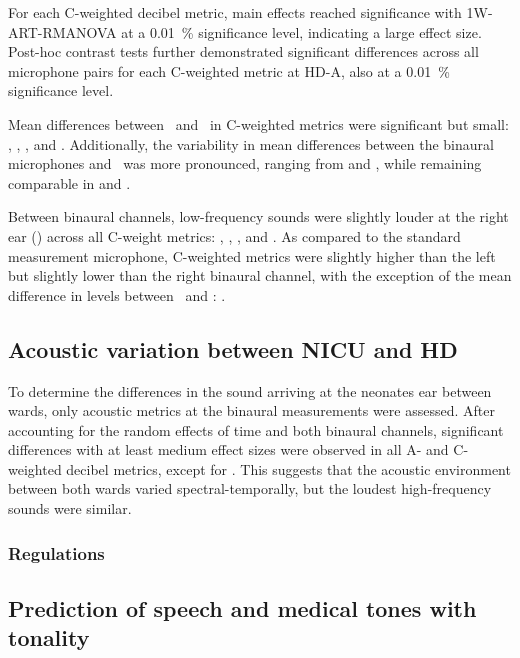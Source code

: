 For each C-weighted decibel metric, main effects reached significance with 1W-ART-RMANOVA at a \SI{0.01}{\percent} significance level, indicating a large effect size. Post-hoc contrast tests further demonstrated significant differences across all microphone pairs for each C-weighted metric at HD-A, also at a \SI{0.01}{\percent} significance level.


Mean differences between \binL\ and \binR\ in C-weighted metrics were significant but small: , , , and  \dbc{}. Additionally, the variability in mean differences between the binaural microphones and \GRASOut\ was more pronounced, ranging from  and , while remaining comparable in  and . 

Between binaural channels, low-frequency sounds were slightly louder at the right ear (\binL) across all C-weight metrics: , , , and  \dbc{}. As compared to the standard measurement microphone, C-weighted metrics were slightly higher than the left but slightly lower than the right binaural channel, with the exception of the mean difference in  levels between \binR\ and \GRASOut:  \dbc{}.



\subsection{Acoustic variation between NICU and HD}

To determine the differences in the sound arriving at the neonates ear between wards, only acoustic metrics at the binaural measurements were assessed. After accounting for the random effects of time and both binaural channels, significant differences with at least medium effect sizes were observed in all A- and C-weighted decibel metrics, except for . This suggests that the acoustic environment between both wards varied spectral-temporally, but the loudest high-frequency sounds were similar. 


\subsubsection{Regulations}






\subsection{Prediction of speech and medical tones with tonality}

